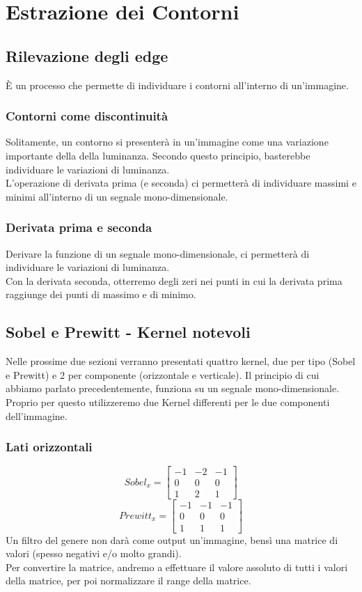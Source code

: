 \documentclass{report}
\begin{document}
	\chapter{Estrazione dei Contorni}
	\section{Rilevazione degli edge}
	È un processo che permette di individuare i contorni all'interno di un'immagine.
	\subsection{Contorni come discontinuità}
	Solitamente, un contorno si presenterà in un'immagine come una variazione importante della della luminanza. Secondo questo principio, basterebbe individuare le variazioni di luminanza.\\
	L'operazione di derivata prima (e seconda) ci permetterà di individuare massimi e minimi all'interno di un segnale mono-dimensionale.
	\subsection{Derivata prima e seconda}
	Derivare la funzione di un segnale mono-dimensionale, ci permetterà di individuare le variazioni di luminanza.\\
	Con la derivata seconda, otterremo degli zeri nei punti in cui la derivata prima raggiunge dei punti di massimo e di minimo.
	\section{Sobel e Prewitt - Kernel notevoli}
	Nelle prossime due sezioni verranno presentati quattro kernel, due per tipo (Sobel e Prewitt) e 2 per componente (orizzontale e verticale). Il principio di cui abbiamo parlato precedentemente, funziona su un segnale mono-dimensionale. Proprio per questo utilizzeremo due Kernel differenti per le due componenti dell'immagine.
	\subsection{Lati orizzontali}
	$$
	Sobel_x = 
	\begin{bmatrix}
		-1 & -2 & -1 \\
		0  & 0  & 0  \\
		1  & 2  & 1  
	\end{bmatrix}
	$$
	$$
	Prewitt_x = 
	\begin{bmatrix}
		-1 & -1 & -1 \\
		0  & 0  & 0  \\
		1  & 1  & 1  
	\end{bmatrix}
	$$
	Un filtro del genere non darà come output un'immagine, bensì una matrice di valori (spesso negativi e/o molto grandi). \\ Per convertire la matrice, andremo a effettuare il valore assoluto di tutti i valori della matrice, per poi normalizzare il range della matrice.
\end{document}
